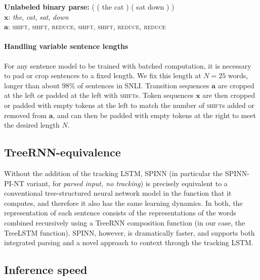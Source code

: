 \documentclass[11pt]{article}
\newcommand{\shift}{\textsc{shift}}
\newcommand{\reduce}{\textsc{reduce}}
\newcommand{\word}[1]{\emph{#1}}
\begin{document}
\vspace{0.5em}
{\noindent\small
{\bf Unlabeled binary parse:} ( ( the cat ) ( sat down ) )\\
{$\mathbf x$}: \word{the}, \word{cat}, \word{sat}, \word{down}\\
{$\mathbf a$}: \shift, \shift, \reduce, \shift, \shift, \reduce, \reduce
}

\paragraph{Handling variable sentence lengths} For any sentence model to be trained with batched computation, it is necessary to pad or crop sentences to a fixed length. We fix this length at $N = 25$ words, longer than about 98\% of sentences in SNLI\@. Transition sequences $\mathbf a$ are cropped at the left or padded at the left with \shift s. Token sequences $\mathbf x$ are then cropped or padded with empty tokens at the left to match the number of \shift s added or removed from $\mathbf a$, and can then be padded with empty tokens at the right to meet the desired length $N$.


\subsection{TreeRNN-equivalence}

Without the addition of the tracking LSTM, SPINN (in particular the SPINN-PI-NT variant, for \textit{parsed input, no tracking}) is precisely equivalent to a conventional tree-structured neural network model in the function that it computes, and therefore it also has the same learning dynamics. In both, the representation of each sentence consists of the representations of the words combined recursively using a TreeRNN composition function (in our case, the TreeLSTM function). SPINN, however, is dramatically faster, and supports both integrated parsing and a novel approach to context through the tracking LSTM.

\subsection{Inference speed}
\label{sec:speed}
\end{document}
